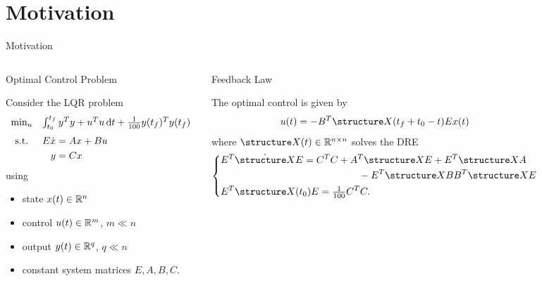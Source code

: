 \section{Motivation}

\begin{frame}{Motivation}
  \begin{columns}[t,onlytextwidth]
  \begin{block}{\strut Optimal Control Problem}
    Consider the \acf{LQR} problem
    \begin{equation*}
      \begin{array}{cl}
        \min_u & \int_{t_0}^{t_f} y^\T y + u^\T u \dt + \tfrac{1}{100} y(t_f)^\T y(t_f) \medskip\\
        \text{s.t.} & \begin{aligned}[t]
          E \dot x &= Ax + Bu \\
          y &= Cx
        \end{aligned}
      \end{array}
    \end{equation*}
    using
    \begin{itemize}
      \item
        state $x(t)\in\mathbb{R}^n$
      \item
        control $u(t)\in\mathbb{R}^m$, $m\ll n$
      \item
        output $y(t)\in\mathbb{R}^q$, $q\ll n$
      \item
        constant system matrices $E,A,B,C$.
    \end{itemize}
  \end{block}
  \pause
  \begin{block}{\strut Feedback Law \parencite[e.g.][]{Locatelli2011}}
    The optimal control is given by
    \begin{equation*}
      u(t) = -
        B^\T \structure X(t_f+t_0-t) E
      x(t)
    \end{equation*}
    where $\structure X(t)\in\R^{n\times n}$ solves the \acf{DRE}
    \begin{equation*}
      \left\{
        \begin{lgathered}
          E^\T \dot{\structure X} E = \begin{multlined}[t]
            C^\T C + A^\T \structure X E + E^\T \structure X A \\ - E^\T \structure X BB^\T \structure X E
          \end{multlined} \\
          E^\T \structure X(t_0) E = \tfrac{1}{100} C^\T C
          .
        \end{lgathered}
      \right.
    \end{equation*}
  \end{block}
  \end{columns}
\end{frame}

